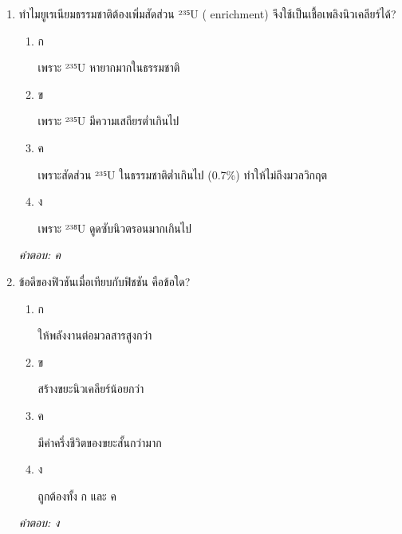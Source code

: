 \documentclass[12pt]{article}
\begin{document}
\begin{enumerate}[label=\arabic*., itemsep=0.5\baselineskip, topsep=0.5\baselineskip, leftmargin=*]
\item ทำไมยูเรเนียมธรรมชาติต้องเพิ่มสัดส่วน ²³⁵U ( enrichment) จึงใช้เป็นเชื้อเพลิงนิวเคลียร์ได้?
\begin{enumerate}[label=\alph*)., itemsep=0.3\baselineskip, topsep=0.3\baselineskip]
\item ก\ 
\begin{minipage}[t]{0.9\linewidth}
\raggedright เพราะ ²³⁵U หายากมากในธรรมชาติ
\end{minipage}
\item ข\ 
\begin{minipage}[t]{0.9\linewidth}
\raggedright เพราะ ²³⁵U มีความเสถียรต่ำเกินไป
\end{minipage}
\item ค\ 
\begin{minipage}[t]{0.9\linewidth}
\raggedright เพราะสัดส่วน ²³⁵U ในธรรมชาติต่ำเกินไป (0.7\%) ทำให้ไม่ถึงมวลวิกฤต
\end{minipage}
\item ง\ 
\begin{minipage}[t]{0.9\linewidth}
\raggedright เพราะ ²³⁸U ดูดซับนิวตรอนมากเกินไป
\end{minipage}
\end{enumerate}
\vspace{-0.3\baselineskip}
\begin{small}
\textit{คำตอบ: ค}
\end{small}

\item ข้อดีของฟิวชันเมื่อเทียบกับฟิชชัน คือข้อใด?
\begin{enumerate}[label=\alph*)., itemsep=0.3\baselineskip, topsep=0.3\baselineskip]
\item ก\ 
\begin{minipage}[t]{0.9\linewidth}
\raggedright ให้พลังงานต่อมวลสารสูงกว่า
\end{minipage}
\item ข\ 
\begin{minipage}[t]{0.9\linewidth}
\raggedright สร้างขยะนิวเคลียร์น้อยกว่า
\end{minipage}
\item ค\ 
\begin{minipage}[t]{0.9\linewidth}
\raggedright มีค่าครึ่งชีวิตของขยะสั้นกว่ามาก
\end{minipage}
\item ง\ 
\begin{minipage}[t]{0.9\linewidth}
\raggedright ถูกต้องทั้ง ก และ ค
\end{minipage}
\end{enumerate}
\vspace{-0.3\baselineskip}
\begin{small}
\textit{คำตอบ: ง}
\end{small}


\end{enumerate}
\end{document}
